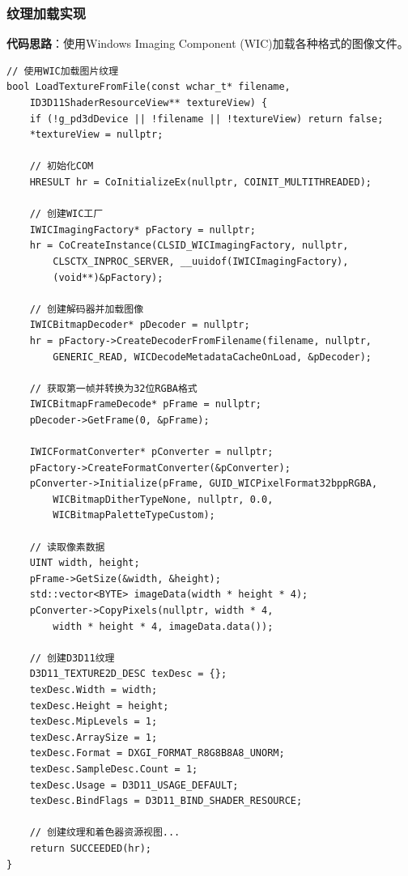 \documentclass[12pt,a4paper]{article}
\begin{document}
\begin{tcolorbox}
\subsubsection{纹理加载实现}

\textbf{代码思路}：使用Windows Imaging Component (WIC)加载各种格式的图像文件。

\begin{lstlisting}[caption={纹理加载函数}]
// 使用WIC加载图片纹理
bool LoadTextureFromFile(const wchar_t* filename, 
    ID3D11ShaderResourceView** textureView) {
    if (!g_pd3dDevice || !filename || !textureView) return false;
    *textureView = nullptr;
    
    // 初始化COM
    HRESULT hr = CoInitializeEx(nullptr, COINIT_MULTITHREADED);
    
    // 创建WIC工厂
    IWICImagingFactory* pFactory = nullptr;
    hr = CoCreateInstance(CLSID_WICImagingFactory, nullptr,
        CLSCTX_INPROC_SERVER, __uuidof(IWICImagingFactory),
        (void**)&pFactory);
    
    // 创建解码器并加载图像
    IWICBitmapDecoder* pDecoder = nullptr;
    hr = pFactory->CreateDecoderFromFilename(filename, nullptr,
        GENERIC_READ, WICDecodeMetadataCacheOnLoad, &pDecoder);
    
    // 获取第一帧并转换为32位RGBA格式
    IWICBitmapFrameDecode* pFrame = nullptr;
    pDecoder->GetFrame(0, &pFrame);
    
    IWICFormatConverter* pConverter = nullptr;
    pFactory->CreateFormatConverter(&pConverter);
    pConverter->Initialize(pFrame, GUID_WICPixelFormat32bppRGBA,
        WICBitmapDitherTypeNone, nullptr, 0.0, 
        WICBitmapPaletteTypeCustom);
    
    // 读取像素数据
    UINT width, height;
    pFrame->GetSize(&width, &height);
    std::vector<BYTE> imageData(width * height * 4);
    pConverter->CopyPixels(nullptr, width * 4, 
        width * height * 4, imageData.data());
    
    // 创建D3D11纹理
    D3D11_TEXTURE2D_DESC texDesc = {};
    texDesc.Width = width;
    texDesc.Height = height;
    texDesc.MipLevels = 1;
    texDesc.ArraySize = 1;
    texDesc.Format = DXGI_FORMAT_R8G8B8A8_UNORM;
    texDesc.SampleDesc.Count = 1;
    texDesc.Usage = D3D11_USAGE_DEFAULT;
    texDesc.BindFlags = D3D11_BIND_SHADER_RESOURCE;
    
    // 创建纹理和着色器资源视图...
    return SUCCEEDED(hr);
}
\end{lstlisting}
\end{tcolorbox}
\end{document}
